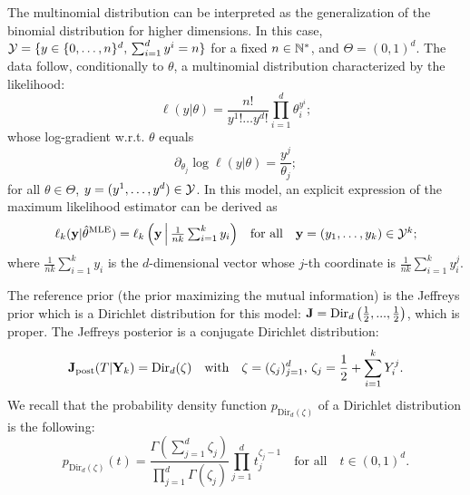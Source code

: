 The multinomial distribution can be interpreted as the generalization of the binomial distribution for higher dimensions. 
In this case, %
 $\mathcal{Y}=\{y\in\{0,\dots,n\}^d,\,\sum_{i=1}^dy^i=n\} $ for a fixed $n\in\mathbb{N}^\ast$, and 
 $\Theta=(0,1)^d$. The data follow, conditionally to $\theta$, a multinomial distribution characterized  by the likelihood:
 \begin{equation}
     \ell(y|\theta) = \frac{n!}{y^1!\dots y^d!}\prod_{i=1}^d\theta_i^{y^i};
 \end{equation}
 whose log-gradient w.r.t. $\theta$ equals
    \begin{equation}
        \partial_{\theta_j}\log\ell(y|\theta) = \frac{y^j}{\theta_j};
    \end{equation}
for all $\theta\in\Theta$, $y=(y^{1},\dots,y^d)\in\mathcal{Y}$.
In this model, an explicit expression of the maximum likelihood estimator can be derived as
    \begin{equation}
        \ell_k(\mathbf{y}|\hat\theta^{\text{MLE}}) = \textstyle{ \ell_k\left(\mathbf{y}\,\middle|\, \frac{1}{nk}\sum_{i=1}^{k}y_i  \right)}\quad \text{for all} \quad \mathbf{y}=(y_1,\dots,y_k)\in\mathcal{Y}^k;
    \end{equation}
where $\frac{1}{nk}\sum_{i=1}^{k}y_i$ is the $d$-dimensional vector whose $j$-th coordinate is $\frac{1}{nk}\sum_{i=1}^{k}y_i^j$.


The reference prior (the prior maximizing the mutual information) is the Jeffreys prior which is a Dirichlet distribution for this model:  $\mathbf{J}= \text{Dir}_d \left(\frac{1}{2}, ... , \frac{1}{2} \right)$, which is proper.
The Jeffreys posterior is a conjugate Dirichlet distribution: 
\begin{equation}
    \mathbf{J}_{\text{post}}(T| \mathbf{Y}_k) = \text{Dir}_d(\zeta) \quad \text{with} \quad \zeta=(\zeta_j)_{j=1}^d,\,\zeta_j= \frac{1}{2} + \sum_{i=1}^k Y_i^j .    
\end{equation}
We recall that the probability density function $p_{\text{Dir}_d(\zeta)}$ of a Dirichlet distribution is the following: 
\begin{equation}
    p_{\text{Dir}_d(\zeta)}(t) = \frac{\Gamma(\sum_{j=1}^d \zeta_j)}{\prod_{j=1}^d \Gamma(\zeta_j)} \prod_{j=1}^d t_j^{\zeta_j - 1} \quad\text{for all}\quad t\in(0,1)^d.    
\end{equation}


